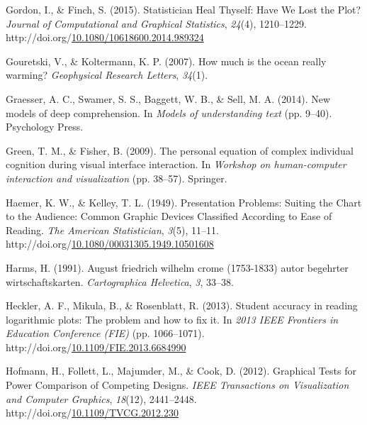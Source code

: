 \documentclass[print]{nuthesis}
\newlength{\cslhangindent}
\newenvironment{CSLReferences}%
{\setlength{\parindent}{0pt}%
\everypar{\setlength{\hangindent}{\cslhangindent}}\ignorespaces}%
{\par}
\begin{document}
\begin{CSLReferences}{1}{0}
\leavevmode{}%
Gordon, I., \& Finch, S. (2015). Statistician {Heal} {Thyself}: {Have} {We} {Lost} the {Plot}? \emph{Journal of Computational and Graphical Statistics}, \emph{24}(4), 1210--1229. http://doi.org/\href{https://doi.org/10.1080/10618600.2014.989324}{10.1080/10618600.2014.989324}

\leavevmode{}%
Gouretski, V., \& Koltermann, K. P. (2007). How much is the ocean really warming? \emph{Geophysical Research Letters}, \emph{34}(1).

\leavevmode{}%
Graesser, A. C., Swamer, S. S., Baggett, W. B., \& Sell, M. A. (2014). New models of deep comprehension. In \emph{Models of understanding text} (pp. 9--40). Psychology Press.

\leavevmode{}%
Green, T. M., \& Fisher, B. (2009). The personal equation of complex individual cognition during visual interface interaction. In \emph{Workshop on human-computer interaction and visualization} (pp. 38--57). Springer.

\leavevmode{}%
Haemer, K. W., \& Kelley, T. L. (1949). Presentation {Problems}: {Suiting} the {Chart} to the {Audience}: {Common} {Graphic} {Devices} {Classified} {According} to {Ease} of {Reading}. \emph{The American Statistician}, \emph{3}(5), 11--11. http://doi.org/\href{https://doi.org/10.1080/00031305.1949.10501608}{10.1080/00031305.1949.10501608}

\leavevmode{}%
Harms, H. (1991). August friedrich wilhelm crome (1753-1833) autor begehrter wirtschaftskarten. \emph{Cartographica Helvetica}, \emph{3}, 33--38.

\leavevmode{}%
Heckler, A. F., Mikula, B., \& Rosenblatt, R. (2013). Student accuracy in reading logarithmic plots: {The} problem and how to fix it. In \emph{2013 {IEEE} {Frontiers} in {Education} {Conference} ({FIE})} (pp. 1066--1071). http://doi.org/\href{https://doi.org/10.1109/FIE.2013.6684990}{10.1109/FIE.2013.6684990}

\leavevmode{}%
Hofmann, H., Follett, L., Majumder, M., \& Cook, D. (2012). Graphical {Tests} for {Power} {Comparison} of {Competing} {Designs}. \emph{IEEE Transactions on Visualization and Computer Graphics}, \emph{18}(12), 2441--2448. http://doi.org/\href{https://doi.org/10.1109/TVCG.2012.230}{10.1109/TVCG.2012.230}


\end{CSLReferences}
\end{document}
